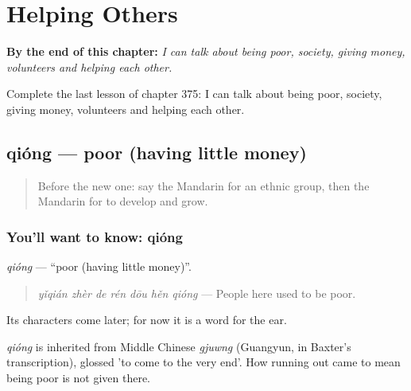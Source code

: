 
\chapter{Helping Others}
\label{ch:zh-helping-others}

\begin{chapteropening}
\textbf{By the end of this chapter:} \emph{I can talk about being poor, society, giving money, volunteers and helping each other.}

Complete the last lesson of chapter 375: I can talk about being poor, society, giving money, volunteers and helping each other.
\end{chapteropening}

\section[qióng]{qióng — poor (having little money)}

\label{lesson:ZH-C375-qiong}



\begin{quote}
Before the new one: say the Mandarin for an ethnic group, then the Mandarin for to develop and grow.
\end{quote}

\subsection*{You'll want to know: qióng}
\emph{qióng} — \textquotedblleft{}poor (having little money)\textquotedblright{}.

\begin{quote}
\emph{yǐqián zhèr de rén dōu hěn qióng} — People here used to be poor.
\end{quote}

Its characters come later; for now it is a word for the ear.

\begin{cousinweb}
\emph{qióng} is inherited from Middle Chinese \emph{gjuwng} (Guangyun, in Baxter's transcription), glossed 'to come to the very end'. How running out came to mean being poor is not given there.
\end{cousinweb}

